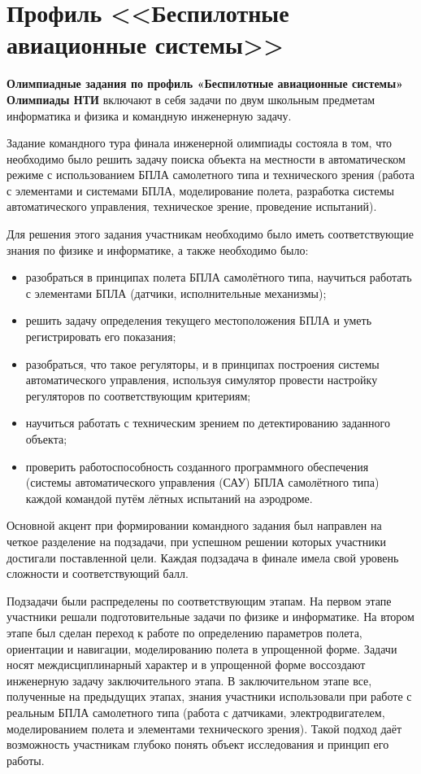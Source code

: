 

\section*{Профиль <<Беспилотные авиационные системы>>}

\textbf{Олимпиадные задания по профиль «Беспилотные авиационные системы» Олимпиады НТИ} включают в себя задачи по двум школьным предметам информатика и физика и командную инженерную задачу.

Задание командного тура финала инженерной олимпиады состояла в том, что необходимо было решить задачу поиска объекта на местности в автоматическом режиме с использованием БПЛА самолетного типа и технического зрения (работа с элементами и системами БПЛА, моделирование полета, разработка системы автоматического управления, техническое зрение, проведение испытаний).

Для решения этого задания участникам необходимо было иметь соответствующие знания по физике и информатике, а также необходимо было:
\begin{itemize}
    \item разобраться в принципах полета БПЛА самолётного типа, научиться работать с элементами БПЛА (датчики, исполнительные механизмы);
    \item решить задачу определения текущего местоположения БПЛА и уметь регистрировать его показания;
    \item разобраться, что такое регуляторы, и в принципах построения системы автоматического управления, используя симулятор провести настройку регуляторов по соответствующим критериям;
    \item научиться работать с техническим зрением по детектированию заданного объекта;
    \item проверить работоспособность созданного программного обеспечения (системы автоматического управления (САУ) БПЛА самолётного типа) каждой командой путём лётных испытаний на аэродроме.
\end{itemize}

Основной акцент при формировании командного задания был направлен на четкое разделение на подзадачи, при успешном решении которых участники достигали поставленной цели. Каждая подзадача в финале имела свой уровень сложности и соответствующий балл.

Подзадачи были распределены по соответствующим этапам. На первом этапе участники решали подготовительные задачи по физике и информатике. На втором этапе был сделан переход к работе по определению параметров полета, ориентации и навигации, моделированию полета в упрощенной форме. Задачи носят междисциплинарный характер и в упрощенной форме воссоздают инженерную задачу заключительного этапа. В заключительном этапе все, полученные на предыдущих этапах, знания участники использовали при работе с реальным БПЛА самолетного типа (работа с датчиками, электродвигателем, моделированием полета и элементами технического зрения). Такой подход даёт возможность участникам глубоко понять объект исследования и принцип его работы.